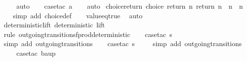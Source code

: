\begin{isabellebody}
\ \ \ \isamarkupfalse%
\ auto{\isacharbrackleft}{}{\isacharbrackright}\isanewline
\ \ \isamarkupfalse%
\ {\isacharparenleft}case{\isacharunderscore}tac\ {\isachardoublequoteopen}a{\isacharequal}{}{\isachardoublequoteclose}{\isacharparenright}\isanewline
\ \ \isamarkupfalse%
\ auto%
\endisatagproof
{\isafoldproof}%
%
\isadelimproof
\isanewline
%
\endisadelimproof
\isanewline
{}\isamarkupfalse%
\ choice{\isacharunderscore}return{\isacharcolon}\ {\isachardoublequoteopen}choice\ {\isacharparenleft}return\ n{\isacharparenright}\ {\isacharparenleft}return\ n{\isacharprime}{\isacharparenright}\ {\isasymLongrightarrow}\ n\ {\isacharequal}\ n{\isacharprime}{\isachardoublequoteclose}\isanewline
%
\isadelimproof
\ \ %
\endisadelimproof
%
\isatagproof
{}\isamarkupfalse%
\ {\isacharparenleft}simp\ add{\isacharcolon}\ choice{\isacharunderscore}def{\isacharparenright}\isanewline
\ \ \isamarkupfalse%
\ value{\isacharunderscore}eq{\isacharunderscore}true\ \isamarkupfalse%
\ auto%
\endisatagproof
{\isafoldproof}%
%
\isadelimproof
\isanewline
%
\endisadelimproof
\isanewline
{}\isamarkupfalse%
\ deterministic{\isacharunderscore}lift{\isacharcolon}\ {\isachardoublequoteopen}deterministic\ lift{\isachardoublequoteclose}\isanewline
%
\isadelimproof
\ \ %
\endisadelimproof
%
\isatagproof
{}\isamarkupfalse%
\ {\isacharparenleft}rule\ outgoing{\isacharunderscore}transitions{\isacharunderscore}fprod{\isacharunderscore}deterministic{\isacharparenright}\isanewline
\ \ \isamarkupfalse%
\ {\isacharparenleft}case{\isacharunderscore}tac\ {\isachardoublequoteopen}s{\isacharequal}{}{\isachardoublequoteclose}{\isacharparenright}\isanewline
\ \ \ \isamarkupfalse%
\ {\isacharparenleft}simp\ add{\isacharcolon}\ outgoing{\isacharunderscore}transitions{\isacharunderscore}{}{\isacharparenright}\isanewline
\ \ \isamarkupfalse%
\ {\isacharparenleft}case{\isacharunderscore}tac\ {\isachardoublequoteopen}s{\isacharequal}{}{\isachardoublequoteclose}{\isacharparenright}\isanewline
\ \ \ \isamarkupfalse%
\ {\isacharparenleft}simp\ add{\isacharcolon}\ outgoing{\isacharunderscore}transitions{\isacharunderscore}{}{\isacharparenright}\isanewline
\ \ \ \isamarkupfalse%
\ {\isacharparenleft}case{\isacharunderscore}tac\ {\isachardoublequoteopen}ba{\isacharequal}up{}{}{\isachardoublequoteclose}{\isacharparenright}\isanewline

\end{isabellebody}
